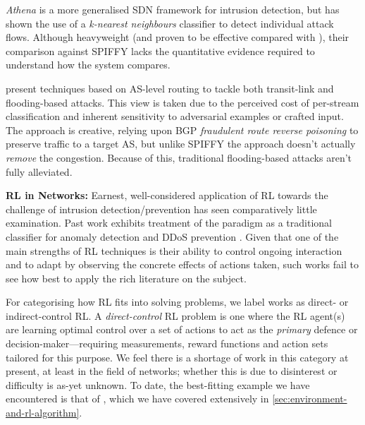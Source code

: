 \documentclass[conference, letterpaper, 10pt, times]{IEEEtran}
\newcommand{\fakepara}[1]{\noindent\textbf{#1:}}
\begin{document}
\emph{Athena} \cite{DBLP:conf/dsn/LeeKSPY17} is a more generalised SDN framework for intrusion detection, but has shown the use of a \emph{k-nearest neighbours} classifier to detect individual attack flows.
Although heavyweight (and proven to be effective compared with \textcite{DBLP:conf/lcn/BragaMP10}), their comparison against SPIFFY lacks the quantitative evidence required to understand how the system compares.

\Textcite{DBLP:conf/sp/SmithS18} present techniques based on AS-level routing to tackle both transit-link and flooding-based attacks.
This view is taken due to the perceived cost of per-stream classification and inherent sensitivity to adversarial examples or crafted input.
The approach is creative, relying upon BGP \emph{fraudulent route reverse poisoning} to preserve traffic to a target AS, but unlike SPIFFY the approach doesn't actually \emph{remove} the congestion.
Because of this, traditional flooding-based attacks aren't fully alleviated.

\fakepara{RL in Networks}
Earnest, well-considered application of RL towards the challenge of intrusion detection/prevention has seen comparatively little examination.
Past work exhibits treatment of the paradigm as a traditional classifier for anomaly detection \cite{shamshirband2014anomaly} and DDoS prevention \cite{DBLP:conf/mates/ServinK08}.
Given that one of the main strengths of RL techniques is their ability to control ongoing interaction and to adapt by observing the concrete effects of actions taken, such works fail to see how best to apply the rich literature on the subject.

For categorising how RL fits into solving problems, we label works as direct- or indirect-control RL.
A \emph{direct-control} RL problem is one where the RL agent(s) are learning optimal control over a set of actions to act as the \emph{primary} defence or decision-maker---requiring measurements, reward functions and action sets tailored for this purpose.
We feel there is a shortage of work in this category at present, at least in the field of networks; whether this is due to disinterest or difficulty is as-yet unknown.
To date, the best-fitting example we have encountered is that of \textcite{DBLP:journals/eaai/MalialisK15}, which we have covered extensively in \cref{sec:environment-and-rl-algorithm}.
\end{document}

